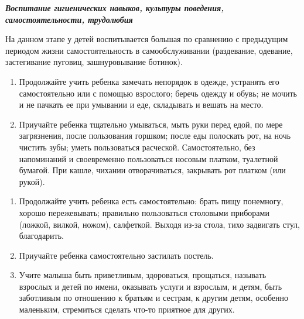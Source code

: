 \documentclass[a5paper]{book}
\renewcommand{\emph}[1]{\textit{#1}}
\begin{document}
\emph{\textbf{Воспитание гигиенических навыков, культуры поведения,
самостоятельности, трудолюбия}}

На данном этапе у детей воспитывается большая по сравнению с предыдущим
периодом жизни самостоятельность в самообслуживании (раздевание,
одевание, застегивание пуговиц, зашнуровывание ботинок).


\begin{enumerate}
\def\labelenumi{\arabic{enumi}.}
\item
  
  Продолжайте учить ребенка замечать непорядок в одежде, устранять его
  самостоятельно или с помощью взрослого; беречь одежду и обувь; не
  мочить и не пачкать ее при умывании и еде, складывать и вешать на
  место.
  
\item
  
  Приучайте ребенка тщательно умываться, мыть руки перед едой, по мере
  загрязнения, после пользования горшком; после еды полоскать рот, на
  ночь чистить зубы; уметь пользоваться расческой. Самостоятельно, без
  напоминаний и своевременно пользоваться носовым платком, туалетной
  бумагой. При кашле, чихании отворачиваться, закрывать рот платком (или
  рукой).
  
\end{enumerate}

\begin{enumerate}
\def\labelenumi{\arabic{enumi}.}
\setcounter{enumi}{2}
\item
  
  Продолжайте учить ребенка есть самостоятельно: брать пищу понемногу,
  хорошо пережевывать; правильно пользоваться столовыми приборами
  (ложкой, вилкой, ножом), салфеткой. Выходя из-за стола, тихо задвигать
  стул, благодарить.
  
\item
  
  Приучайте ребенка самостоятельно застилать постель.
  
\item
  
  Учите малыша быть приветливым, здороваться, прощаться, называть
  взрослых и детей по имени, оказывать услуги и взрослым, и детям, быть
  заботливым по отношению к братьям и сестрам, к другим детям, особенно
  маленьким, стремиться сделать что-то приятное для других.
  
\end{enumerate}
\end{document}
